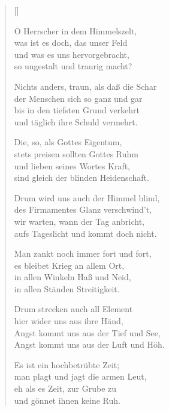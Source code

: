\begin{multicols}{2}
\settowidth{\versewidth}{Nichts anders, traun, als daß die Schar}
\begin{verse}[\versewidth]

 O Herrscher in dem Himmelszelt,\\
was ist es doch, das unser Feld\\
und was es uns hervorgebracht,\\
so ungestalt und traurig macht?

 Nichts anders, traun, als daß die Schar\\
der Menschen sich so ganz und gar\\
bis in den tiefsten Grund verkehrt\\
und täglich ihre Schuld vermehrt.

 Die, so, als Gottes Eigentum,\\
stets preisen sollten Gottes Ruhm\\
und lieben seines Wortes Kraft,\\
sind gleich der blinden Heidenschaft.

 Drum wird uns auch der Himmel blind,\\
des Firmamentes Glanz verschwind't,\\
wir warten, wann der Tag anbricht,\\
aufs Tageslicht und kommt doch nicht.

 Man zankt noch immer fort und fort,\\
es bleibet Krieg an allem Ort,\\
in allen Winkeln Haß und Neid,\\
in allen Ständen Streitigkeit.

 Drum strecken auch all Element\\
hier wider uns aus ihre Händ,\\
Angst kommt uns aus der Tief und See,\\
Angst kommt uns aus der Luft und Höh.

 Es ist ein hochbetrübte Zeit;\\
man plagt und jagt die armen Leut,\\
eh als es Zeit, zur Grube zu\\
und gönnet ihnen keine Ruh.


\end{verse}
\end{multicols}
